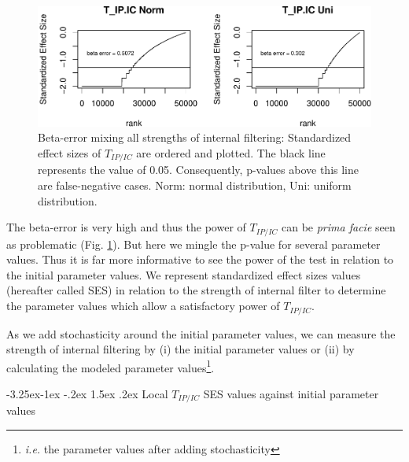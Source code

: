 \documentclass[12pt]{article}\usepackage[]{graphicx}\usepackage[]{color}
\makeatletter
\def\maxwidth{ %
  \ifdim\Gin@nat@width>\linewidth
    \linewidth
  \else
    \Gin@nat@width
  \fi
}
\newenvironment{knitrout}{}{} %
\newcounter {subsubsubsection}[subsubsection]
\newcommand\subsubsubsection{\@startsection{subsubsubsection}{4}{\z@}%
          {-3.25ex\@plus -1ex \@minus -.2ex}%
          {1.5ex \@plus .2ex}%
          {\normalfont\normalsize\bfseries}}
\makeatother
\begin{document}
\begin{knitrout}
\begin{figure}
{\centering \includegraphics[width=\maxwidth]{figure/Internal_filter_results_pval_local-1} 

}

\caption[Beta-error mixing all strengths of internal filtering]{Beta-error mixing all strengths of internal filtering: Standardized effect sizes of $T_{IP/IC}$ are ordered and plotted. The black line represents the value of 0.05. Consequently, p-values above this line are false-negative cases. Norm: normal distribution, Uni: uniform distribution. }\label{fig:Internal_filter_results_pval_local}
\end{figure}


\end{knitrout}

The beta-error is very high and thus the power of $T_{IP/IC}$ can be \textit{prima facie} seen as problematic (Fig. \ref{fig:Internal_filter_results_pval_local}). But here we mingle the p-value for several parameter values. Thus it is far more informative to see the power of the test in relation to the initial parameter values. We represent standardized effect sizes values (hereafter called SES) in relation to the strength of internal filter to determine the parameter values which allow a satisfactory power of $T_{IP/IC}$.

As we add stochasticity around the initial parameter values, we can measure the strength of internal filtering by (i) the initial parameter values or (ii) by calculating the modeled parameter values\footnote{\textit{i.e.} the parameter values after adding stochasticity}.
 
  \subsubsubsection {Local $T_{IP/IC}$ SES values against initial parameter values}
\end{document}
